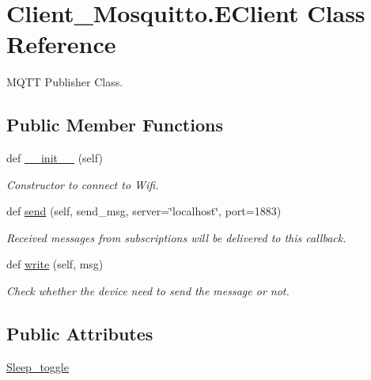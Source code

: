 \hypertarget{class_client___mosquitto_1_1_e_client}{}\section{Client\+\_\+\+Mosquitto.\+E\+Client Class Reference}
\label{class_client___mosquitto_1_1_e_client}


M\+Q\+TT Publisher Class.  


\subsection*{Public Member Functions}
\begin{DoxyCompactItemize}
\item 
def \mbox{\hyperlink{class_client___mosquitto_1_1_e_client_a18c4df566d15af27913550e6b5f4cf50}{\+\_\+\+\_\+init\+\_\+\+\_\+}} (self)
\begin{DoxyCompactList}\small\item\em Constructor to connect to Wifi. \end{DoxyCompactList}\item 
def \mbox{\hyperlink{class_client___mosquitto_1_1_e_client_a382e920d5fc673cc9166991882233d84}{send}} (self, send\+\_\+msg, server=\char`\"{}localhost\char`\"{}, port=1883)
\begin{DoxyCompactList}\small\item\em Received messages from subscriptions will be delivered to this callback. \end{DoxyCompactList}\item 
def \mbox{\hyperlink{class_client___mosquitto_1_1_e_client_a3f95425eee6d7de6a359cb7a0b7d28e6}{write}} (self, msg)
\begin{DoxyCompactList}\small\item\em Check whether the device need to send the message or not. \end{DoxyCompactList}\end{DoxyCompactItemize}
\subsection*{Public Attributes}
\begin{DoxyCompactItemize}
\item 
\mbox{\hyperlink{class_client___mosquitto_1_1_e_client_af71c3f37ad0d60c64fc3ae6fec6c5670}{Sleep\+\_\+toggle}}
\end{DoxyCompactItemize}

